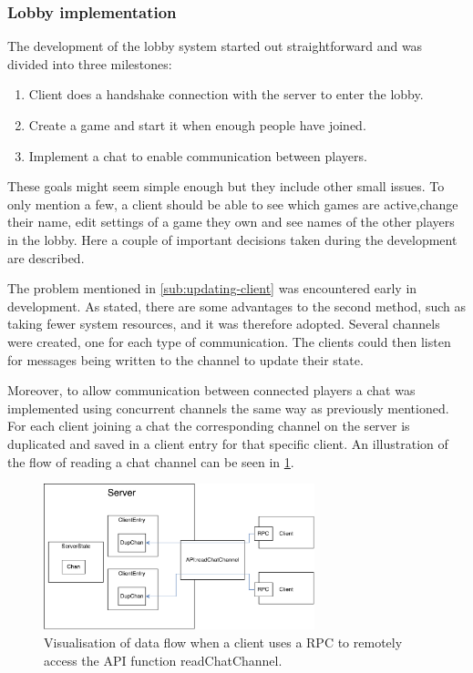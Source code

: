 \documentclass[a4paper]{article}
\begin{document}
\subsubsection{Lobby implementation}
The development of the lobby system started out straightforward and was divided into three milestones:
\begin{enumerate}
    \item Client does a handshake connection with the server to enter the lobby.
    \item Create a game and start it when enough people have joined.
    \item Implement a chat to enable communication between players.
\end{enumerate}
These goals might seem simple enough but they include other small issues. To only mention a few, a client should be able to see which games are active,change their name, edit settings of a game they own and see names of the other players in the lobby. Here a couple of important decisions taken during the development are described.

The problem mentioned in \cref{sub:updating-client} was encountered early in development. As stated, there are some advantages to the second method, such as taking fewer system resources, and it was therefore adopted. Several channels were created, one for each type of communication. The clients could then listen for messages being written to the channel to update their state. 

Moreover, to allow communication between connected players a chat was implemented using concurrent channels the same way as previously mentioned. For each client joining a chat the corresponding channel on the server is duplicated and saved in a client entry for that specific client. An illustration of the flow of reading a chat channel can be seen in \cref{fig:read-chat-from-server}.

\begin{figure}[ht!]
    \centering
    \includegraphics[scale=0.5,width=0.7\textwidth]{figure/readChatFromServer}
    \caption{Visualisation of data flow when a client uses a RPC to remotely access the API function readChatChannel.}
    \label{fig:read-chat-from-server}
\end{figure}
\end{document}
